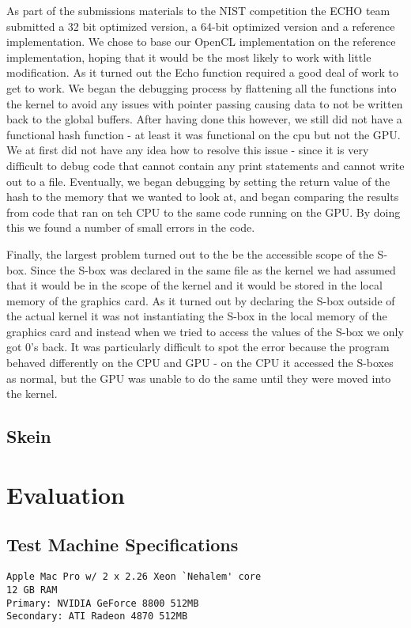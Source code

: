 \documentclass{article}
\begin{document}
As part of the submissions materials to the NIST competition the ECHO team submitted a 32 bit optimized version, a 64-bit optimized version and a reference implementation.  
We chose to base our OpenCL implementation on the reference implementation, hoping that it would be the most likely to work with little modification.
As it turned out the Echo function required a good deal of work to get to work.
We began the debugging process by flattening all the functions into the kernel to avoid any issues with pointer passing causing data to not be written back to the global buffers.
After having done this however, we still did not have a functional hash function - at least it was functional on the cpu but not the GPU.  
We at first did not have any idea how to resolve this issue - since it is very difficult to debug code that cannot contain any print statements and cannot write out to a file. 
Eventually, we began debugging by setting the return value of the hash to the memory that we wanted to look at, and began comparing the results from code that ran on teh CPU to the same code running on the GPU.
By doing this we found a number of small errors in the code.

Finally, the largest problem turned out to the be the accessible scope of the S-box.
Since the S-box was declared in the same file as the kernel we had assumed that it would be in the scope of the kernel and it would be stored in the local memory of the graphics card.
As it turned out by declaring the S-box outside of the actual kernel it was not instantiating the S-box in the local memory of the graphics card and instead when we tried to access the values of the S-box we only got 0's back.
It was particularly difficult to spot the error because the program behaved differently on the CPU and GPU - on the CPU it accessed the S-boxes as normal, but the GPU was unable to do the same until they were moved into the kernel.
\subsection*{Skein}


\section*{Evaluation}

\subsection*{Test Machine Specifications}
\begin{verbatim}
Apple Mac Pro w/ 2 x 2.26 Xeon `Nehalem' core
12 GB RAM
Primary: NVIDIA GeForce 8800 512MB
Secondary: ATI Radeon 4870 512MB
\end{verbatim}
\end{document}
